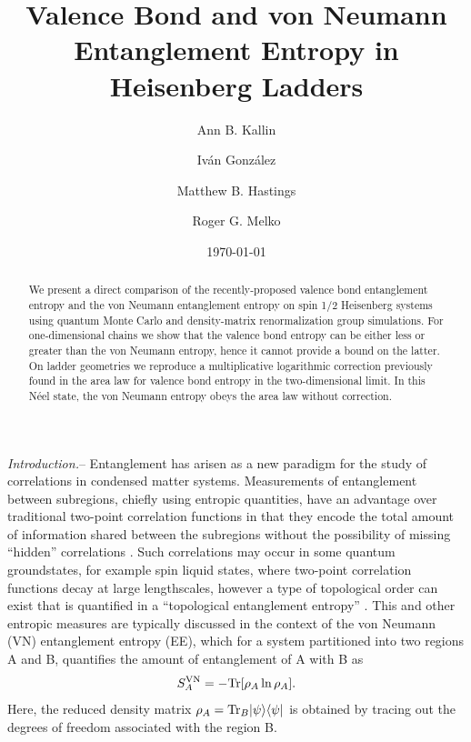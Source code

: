 \documentclass[prl,aps,twocolumn,floatfix,amsmath,amssymb,superscriptaddress,tightenlines]{revtex4}
\begin{document}
\date{\today}
\title{Valence Bond and von Neumann Entanglement Entropy in Heisenberg Ladders}
\author{Ann B. Kallin}

\author{Iv\'an Gonz\'alez}

\author{Matthew B. Hastings}

\author{Roger G. Melko}

\begin{abstract} We present a direct comparison of the recently-proposed
valence bond entanglement entropy and the von Neumann entanglement entropy on
spin 1/2 Heisenberg systems using quantum Monte Carlo and density-matrix
renormalization group simulations.  For one-dimensional chains we
show that the valence bond entropy can be either less or greater than the
von Neumann entropy, hence it cannot provide a bound on the latter.  On
ladder geometries we reproduce a multiplicative logarithmic correction
previously found in the area law for valence bond entropy in the
two-dimensional limit.  In this N\'eel state, the von Neumann entropy
obeys the area law without correction.

\end{abstract}
\maketitle


{\it Introduction.}-- Entanglement has arisen 
as a new paradigm for the study of correlations in condensed matter systems.  
Measurements
of entanglement between subregions, chiefly using entropic
quantities, have an advantage over traditional two-point correlation
functions in that they encode the total amount of information shared
between the subregions without the possibility of missing ``hidden''
correlations \cite{wolf}.  
Such correlations may occur in some quantum groundstates,  for example spin liquid states, 
where two-point correlation functions decay at large lengthscales, however a type of topological order can exist that is quantified in a ``topological entanglement
entropy''  \cite{ KP, LW}.
This and other entropic measures are typically discussed in the context of
the von Neumann (VN) entanglement entropy (EE), which for a system partitioned into
two regions A and B, quantifies the amount of entanglement of A with B as
\begin{equation} 
S^{\rm VN}_A = - {\rm Tr} [ \rho_A \ln \rho_A ]. \label{vNEE} 
\end{equation}
Here, the reduced density matrix $\rho_A = {\rm Tr}_B | \psi \rangle
\langle \psi |$ is obtained by tracing out the degrees of freedom
associated with the region B.
\end{document}
